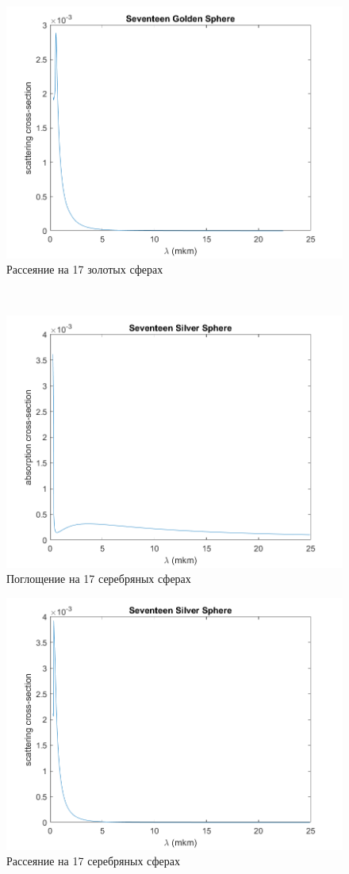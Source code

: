 \begin{figure}[h!]
	\centering
	\includegraphics[width=0.5\linewidth]{seventeenGoldSphereCrossSection}
	\caption{Рассеяние на 17 золотых сферах}
	\label{fig:seventeenGoldSphereCrossSection}
\end{figure} \\
\begin{figure}[h!]
	\centering
	\includegraphics[width=0.5\linewidth]{seventeenSilverSphereAbsorptionSection}
	\caption{Поглощение на 17 серебряных сферах}
	\label{fig:seventeenSilverSphereAbsorptionSection}
\end{figure} 
\begin{figure}[h!]
	\centering
	\includegraphics[width=0.5\linewidth]{seventeenSilverSphereCrossSection}
	\caption{Рассеяние на 17 серебряных сферах}
	\label{fig:seventeenSilverSphereCrossSection}
\end{figure} \\